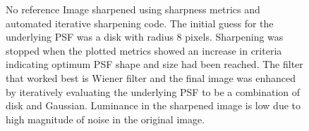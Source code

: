 \begin{figure}[H]
\begin{subfigure}[b]{0.49\textwidth}
        \end{subfigure}             
        \caption{ No reference Image sharpened using sharpness metrics and automated iterative sharpening code. The initial guess for the underlying PSF was a disk with radius 8 pixels. Sharpening was stopped when the plotted metrics showed an increase in criteria indicating optimum PSF shape and size had been reached. The filter that worked best is Wiener filter and the final image was enhanced by iteratively evaluating the underlying PSF to be a combination of disk and Gaussian. Luminance in the sharpened image is low due to high magnitude of noise in the original image.} \label{fig:true_metrics}
\end{figure}

\newpage